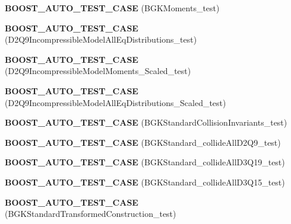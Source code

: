 \begin{DoxyCompactItemize}
\item 
\hypertarget{namespacenatrium_aaddbd8507218a02c3db1181247d759d1}{
{\bfseries BOOST\_\-AUTO\_\-TEST\_\-CASE} (BGKMoments\_\-test)}
\label{namespacenatrium_aaddbd8507218a02c3db1181247d759d1}

\item 
\hypertarget{namespacenatrium_a5d06bb4919a0a0a3c56c0a1de0c2243f}{
{\bfseries BOOST\_\-AUTO\_\-TEST\_\-CASE} (D2Q9IncompressibleModelAllEqDistributions\_\-test)}
\label{namespacenatrium_a5d06bb4919a0a0a3c56c0a1de0c2243f}

\item 
\hypertarget{namespacenatrium_a37799239d4b3fa49a4d8613b0021b2fb}{
{\bfseries BOOST\_\-AUTO\_\-TEST\_\-CASE} (D2Q9IncompressibleModelMoments\_\-Scaled\_\-test)}
\label{namespacenatrium_a37799239d4b3fa49a4d8613b0021b2fb}

\item 
\hypertarget{namespacenatrium_a2d6acb8f854c0728d233d067b69292f8}{
{\bfseries BOOST\_\-AUTO\_\-TEST\_\-CASE} (D2Q9IncompressibleModelAllEqDistributions\_\-Scaled\_\-test)}
\label{namespacenatrium_a2d6acb8f854c0728d233d067b69292f8}

\item 
\hypertarget{namespacenatrium_adbf98857fcf6990496eaab840c849244}{
{\bfseries BOOST\_\-AUTO\_\-TEST\_\-CASE} (BGKStandardCollisionInvariants\_\-test)}
\label{namespacenatrium_adbf98857fcf6990496eaab840c849244}

\item 
\hypertarget{namespacenatrium_ad4e8b85ceefce152b84e7c53e5ad44d0}{
{\bfseries BOOST\_\-AUTO\_\-TEST\_\-CASE} (BGKStandard\_\-collideAllD2Q9\_\-test)}
\label{namespacenatrium_ad4e8b85ceefce152b84e7c53e5ad44d0}

\item 
\hypertarget{namespacenatrium_ad714500b301a39d46458adc5144e5a90}{
{\bfseries BOOST\_\-AUTO\_\-TEST\_\-CASE} (BGKStandard\_\-collideAllD3Q19\_\-test)}
\label{namespacenatrium_ad714500b301a39d46458adc5144e5a90}

\item 
\hypertarget{namespacenatrium_a4b0a05bdc1399a013844bbf877a7f97d}{
{\bfseries BOOST\_\-AUTO\_\-TEST\_\-CASE} (BGKStandard\_\-collideAllD3Q15\_\-test)}
\label{namespacenatrium_a4b0a05bdc1399a013844bbf877a7f97d}

\item 
\hypertarget{namespacenatrium_ad76995868b4ffe00088a84dc3919b49e}{
{\bfseries BOOST\_\-AUTO\_\-TEST\_\-CASE} (BGKStandardTransformedConstruction\_\-test)}
\label{namespacenatrium_ad76995868b4ffe00088a84dc3919b49e}


\end{DoxyCompactItemize}

